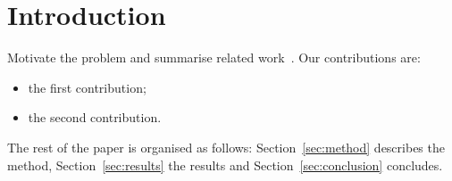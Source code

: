 \section{Introduction}
\label{sec:intro}

Motivate the problem and summarise related work~\cite{knuth1984,lamport1994}.
Our contributions are:
\begin{itemize}
  \item the first contribution;
  \item the second contribution.
\end{itemize}
The rest of the paper is organised as follows: Section~\ref{sec:method}
describes the method, Section~\ref{sec:results} the results and
Section~\ref{sec:conclusion} concludes.

